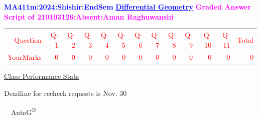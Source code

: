 \documentclass{article}                              %
\begin{document}
%
\vspace*{1in}

\begin{center}
	\textbf{\textcolor{blue}{\LARGE MA411m:2024:Shishir:EndSem}}
	\vskip 1cm
	\textbf{\textcolor{blue}{\underline{\Large Differential Geometry}}}
	\vskip 1cm
	\textbf{\textcolor{magenta}{\LARGE Graded Answer Script of 210103126:Absent:Aman Raghuwanshi}}
\end{center}


\begin{center}
	\Huge 
	\textcolor{red}{
	\begin{tabular}{*{13}{r}}
		Question&Q-1& Q-2& Q-3& Q-4& Q-5& Q-6& Q-7& Q-8& Q-9& Q-10& Q-11&Total  \\
        	YourMarks&0&0&0&0&0&0&0&0&0&0&0&0
	\end{tabular}
	}
        \vskip 2cm
	\large
	\underline{Class Performance Stats}
	\DTLsetseparator{;}
	\begin{table}[htbp]
		\centering
	\end{table}
	\vskip 1cm
	Deadline for recheck requests is Nov. 30
\end{center}
\ \vfill \ \hfill \small AutoG\textsuperscript{\copyright}
\newpage
%
\end{document}
